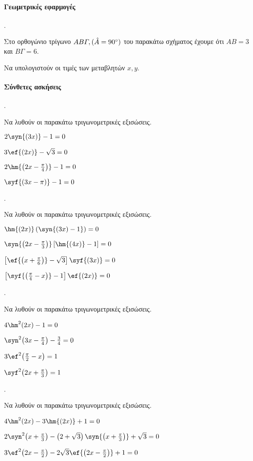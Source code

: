 \documentclass[11pt,a4paper,twocolumn]{article}
\newcounter{askhsh}
\newcommand{\askhsh}{\large\theaskhsh.\ \addtocounter{askhsh}{1}}
\begin{document}
\paragraph{Γεωμετρικές εφαρμογές}
\askhsh Στο ορθογώνιο τρίγωνο $ AB\varGamma,(\hat{A}=90\degree) $ του παρακάτω σχήματος έχουμε ότι $ AB=3 $ και $ B\varGamma=6 $.
\begin{center}
\end{center}
Να υπολογιστούν οι τιμές των μεταβλητών $ x,y $.
\paragraph{Σύνθετες ασκήσεις}
\askhsh Να λυθούν οι παρακάτω τριγωνομετρικές εξισώσεις.
\begin{alist}
\item $ 2\syn{(3x)}-1=0 $
\item $ 3\ef{(2x)}-\sqrt{3}=0 $
\item $ 2\hm{\left( 2x-\frac{\pi}{4}\right) }-1=0 $
\item $ \syf{(3x-\pi)}-1=0 $
\end{alist}
\askhsh Να λυθούν οι παρακάτω τριγωνομετρικές εξισώσεις.
\begin{alist}
\item $ \hm{(2x)}\left(\syn{(3x)-1}\right)=0 $
\item $ \syn{\left(2x-\frac{\pi}{3}\right) } \left[ \hm{(4x)}-1\right]=0 $
\item $ \left[ \ef{\left( x+\frac{\pi}{6}\right)}-\sqrt{3}\right]\syf{(3x)}=0 $
\item $ \left[ \syf{\left( \frac{\pi}{4}-x\right)}-1\right]\ef{(2x)}=0 $
\end{alist}
\askhsh Να λυθούν οι παρακάτω τριγωνομετρικές εξισώσεις.
\begin{alist}
\item $ 4\hm^2{(2x)}-1=0 $
\item $ \syn^2{\left( 3x-\frac{\pi}{4}\right) }-\frac{3}{4}=0 $
\item $ 3\ef^2{\left( \frac{\pi}{2}-x\right) }=1 $
\item $ \syf^2{\left(2x+ \frac{\pi}{3}\right) }=1 $
\end{alist}
\askhsh Να λυθούν οι παρακάτω τριγωνομετρικές εξισώσεις.
\begin{alist}[leftmargin=4mm]
\item $ 4\hm^2{(2x)}-3\hm{(2x)}+1=0 $
\item  $ 2\syn^2{\left( x+\frac{\pi}{3}\right)}-\left( 2+\sqrt{3}\right)\syn{\left( x+\frac{\pi}{3}\right)}+\sqrt{3}=0 $
\item $ 3\ef^2{\left(2x-\frac{\pi}{2} \right) }-2\sqrt{3}\ef{\left(2x-\frac{\pi}{2} \right) }+1=0 $
\end{alist}
\end{document}
